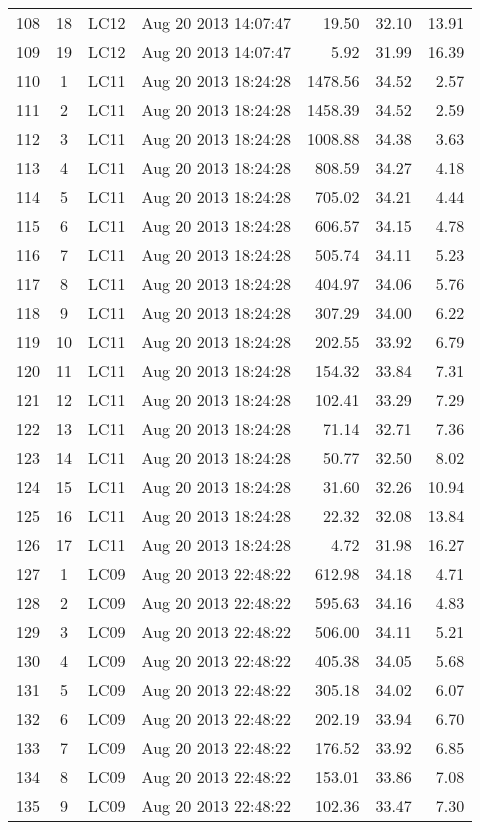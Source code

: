 \documentclass{article}
\begin{document}
\begin{longtable}{ccllrrr}
108&18&LC12&Aug 20 2013 14:07:47&19.50&32.10&13.91\\
109&19&LC12&Aug 20 2013 14:07:47&5.92&31.99&16.39\\
\hline 
110&1&LC11&Aug 20 2013 18:24:28&1478.56&34.52&2.57\\
111&2&LC11&Aug 20 2013 18:24:28&1458.39&34.52&2.59\\
112&3&LC11&Aug 20 2013 18:24:28&1008.88&34.38&3.63\\
113&4&LC11&Aug 20 2013 18:24:28&808.59&34.27&4.18\\
114&5&LC11&Aug 20 2013 18:24:28&705.02&34.21&4.44\\
115&6&LC11&Aug 20 2013 18:24:28&606.57&34.15&4.78\\
116&7&LC11&Aug 20 2013 18:24:28&505.74&34.11&5.23\\
117&8&LC11&Aug 20 2013 18:24:28&404.97&34.06&5.76\\
118&9&LC11&Aug 20 2013 18:24:28&307.29&34.00&6.22\\
119&10&LC11&Aug 20 2013 18:24:28&202.55&33.92&6.79\\
120&11&LC11&Aug 20 2013 18:24:28&154.32&33.84&7.31\\
121&12&LC11&Aug 20 2013 18:24:28&102.41&33.29&7.29\\
122&13&LC11&Aug 20 2013 18:24:28&71.14&32.71&7.36\\
123&14&LC11&Aug 20 2013 18:24:28&50.77&32.50&8.02\\
124&15&LC11&Aug 20 2013 18:24:28&31.60&32.26&10.94\\
125&16&LC11&Aug 20 2013 18:24:28&22.32&32.08&13.84\\
126&17&LC11&Aug 20 2013 18:24:28&4.72&31.98&16.27\\
\hline 
127&1&LC09&Aug 20 2013 22:48:22&612.98&34.18&4.71\\
128&2&LC09&Aug 20 2013 22:48:22&595.63&34.16&4.83\\
129&3&LC09&Aug 20 2013 22:48:22&506.00&34.11&5.21\\
130&4&LC09&Aug 20 2013 22:48:22&405.38&34.05&5.68\\
131&5&LC09&Aug 20 2013 22:48:22&305.18&34.02&6.07\\
132&6&LC09&Aug 20 2013 22:48:22&202.19&33.94&6.70\\
133&7&LC09&Aug 20 2013 22:48:22&176.52&33.92&6.85\\
134&8&LC09&Aug 20 2013 22:48:22&153.01&33.86&7.08\\
135&9&LC09&Aug 20 2013 22:48:22&102.36&33.47&7.30\\

\end{longtable}
\end{document}
